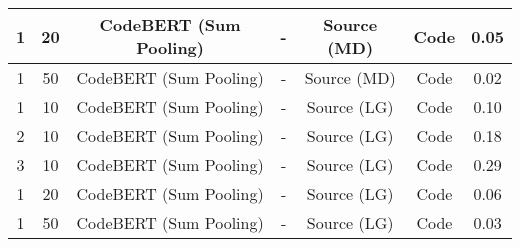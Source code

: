 \begin{longtable}{|c|c|c|c|c|c|c|}
\hline
1 & 20 & CodeBERT (Sum Pooling) & - & Source (MD) & Code & 0.05 \\
\hline
1 & 50 & CodeBERT (Sum Pooling) & - & Source (MD) & Code & 0.02 \\
\hline
1 & 10 & CodeBERT (Sum Pooling) & - & Source (LG) & Code & 0.10 \\
\hline
2 & 10 & CodeBERT (Sum Pooling) & - & Source (LG) & Code & 0.18 \\
\hline
3 & 10 & CodeBERT (Sum Pooling) & - & Source (LG) & Code & 0.29 \\
\hline
1 & 20 & CodeBERT (Sum Pooling) & - & Source (LG) & Code & 0.06 \\
\hline
1 & 50 & CodeBERT (Sum Pooling) & - & Source (LG) & Code & 0.03 \\
\hline
\end{longtable}
